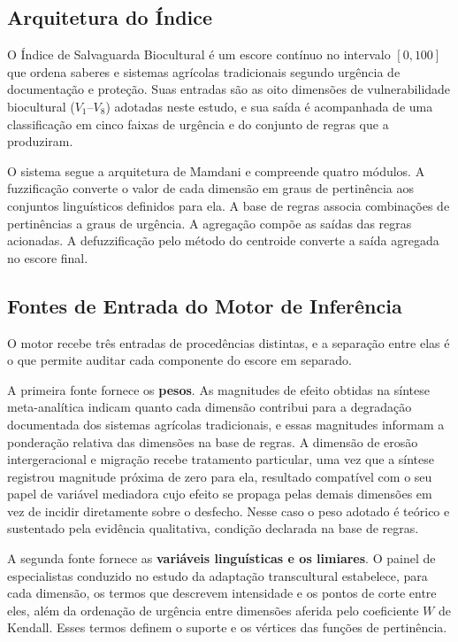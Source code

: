 \documentclass[pdflatex,sn-basic]{sn-jnl}%
\theoremstyle{thmstyleone}%
\theoremstyle{thmstyletwo}%
\theoremstyle{thmstylethree}%
\begin{document}
\subsection{Arquitetura do Índice}

O Índice de Salvaguarda Biocultural é um escore contínuo no intervalo $[0,100]$ que ordena saberes e sistemas agrícolas tradicionais segundo urgência de documentação e proteção. Suas entradas são as oito dimensões de vulnerabilidade biocultural ($V_1$--$V_8$) adotadas neste estudo, e sua saída é acompanhada de uma classificação em cinco faixas de urgência e do conjunto de regras que a produziram.

O sistema segue a arquitetura de Mamdani \cite{Mamdani1975} e compreende quatro módulos. A fuzzificação converte o valor de cada dimensão em graus de pertinência aos conjuntos linguísticos definidos para ela. A base de regras associa combinações de pertinências a graus de urgência. A agregação compõe as saídas das regras acionadas. A defuzzificação pelo método do centroide converte a saída agregada no escore final.

\subsection{Fontes de Entrada do Motor de Inferência}

O motor recebe três entradas de procedências distintas, e a separação entre elas é o que permite auditar cada componente do escore em separado.

A primeira fonte fornece os \textbf{pesos}. As magnitudes de efeito obtidas na síntese meta-analítica indicam quanto cada dimensão contribui para a degradação documentada dos sistemas agrícolas tradicionais, e essas magnitudes informam a ponderação relativa das dimensões na base de regras. A dimensão de erosão intergeracional e migração recebe tratamento particular, uma vez que a síntese registrou magnitude próxima de zero para ela, resultado compatível com o seu papel de variável mediadora cujo efeito se propaga pelas demais dimensões em vez de incidir diretamente sobre o desfecho. Nesse caso o peso adotado é teórico e sustentado pela evidência qualitativa, condição declarada na base de regras.

A segunda fonte fornece as \textbf{variáveis linguísticas e os limiares}. O painel de especialistas conduzido no estudo da adaptação transcultural estabelece, para cada dimensão, os termos que descrevem intensidade e os pontos de corte entre eles, além da ordenação de urgência entre dimensões aferida pelo coeficiente $W$ de Kendall. Esses termos definem o suporte e os vértices das funções de pertinência.
\end{document}
